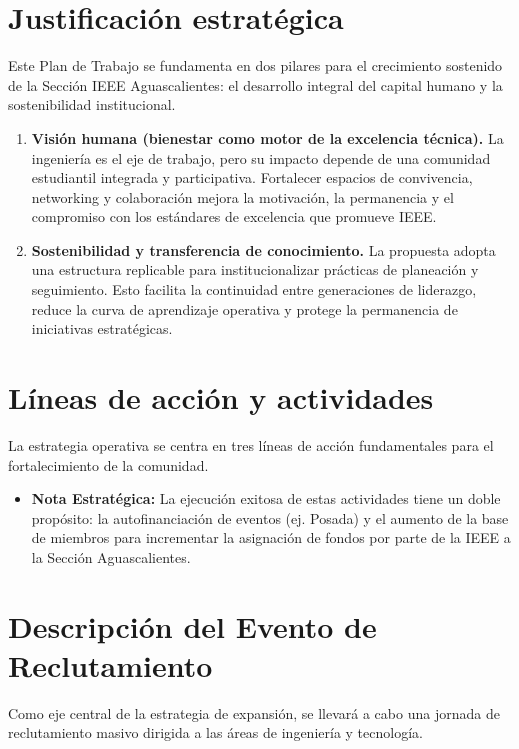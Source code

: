\documentclass[11pt,a4paper]{article}
\begin{document}
\section{Justificación estratégica}
Este Plan de Trabajo se fundamenta en dos pilares para el crecimiento sostenido de la Sección IEEE Aguascalientes: el desarrollo integral del capital humano y la sostenibilidad institucional.
\begin{enumerate}
    \item \textbf{Visión humana (bienestar como motor de la excelencia técnica).} La ingeniería es el eje de trabajo, pero su impacto depende de una comunidad estudiantil integrada y participativa. Fortalecer espacios de convivencia, networking y colaboración mejora la motivación, la permanencia y el compromiso con los estándares de excelencia que promueve IEEE.
    \item \textbf{Sostenibilidad y transferencia de conocimiento.} La propuesta adopta una estructura replicable para institucionalizar prácticas de planeación y seguimiento. Esto facilita la continuidad entre generaciones de liderazgo, reduce la curva de aprendizaje operativa y protege la permanencia de iniciativas estratégicas.

\end{enumerate}
\section{Líneas de acción y actividades}

La estrategia operativa se centra en tres líneas de acción fundamentales para el fortalecimiento de la comunidad.

\begin{itemize}[leftmargin=1.5cm]
    \item \textbf{Nota Estratégica:} La ejecución exitosa de estas actividades tiene un doble propósito: la autofinanciación de eventos (ej. Posada) y el aumento de la base de miembros para incrementar la asignación de fondos por parte de la IEEE a la Sección Aguascalientes.
\end{itemize}

\section{Descripción del Evento de Reclutamiento}
Como eje central de la estrategia de expansión, se llevará a cabo una jornada de reclutamiento masivo dirigida a las áreas de ingeniería y tecnología.
\end{document}
